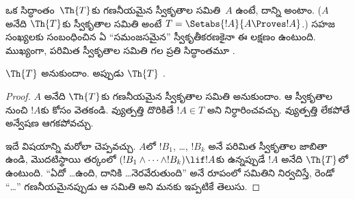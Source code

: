 \documentclass[../../../include/open-logic-section]{subfiles}
\begin{document}


ఒక సిద్ధాంతం~$\Th{T}$కు గణనీయమైన స్వీకృతాల సమితి~$A$ ఉంటే, దాన్ని
\emph{} అంటాం. ($A$ అనేది $\Th{T}$కు స్వీకృతాల సమితి
అంటే $T = \Setabs{!A}{A \Proves !A}$.) సహజ సంఖ్యలకు సంబంధించిన ఏ
``సమంజసమైన'' స్వీకృతీకరణకైనా ఈ లక్షణం ఉంటుంది. ముఖ్యంగా, పరిమిత స్వీకృతాల
సమితి గల ప్రతి సిద్ధాంతమూ .

\begin{lem}
$\Th{T}$  అనుకుందాం. అప్పుడు $\Th{T}$
.
\end{lem}

\begin{proof}
$A$ అనేది $\Th{T}$కు గణనీయమైన స్వీకృతాల సమితి అనుకుందాం. ఆ
స్వీకృతాల నుంచి $!A$కు  కోసం వెతకండి.
వ్యుత్పత్తి దొరికితే $!A \in T$ అని నిర్ధారించవచ్చు. వ్యుత్పత్తి లేకపోతే
అన్వేషణ ఆగకపోవచ్చు.

ఇదే విషయాన్ని మరోలా చెప్పవచ్చు. $A$లో $!B_1$, \dots, $!B_k$ అనే పరిమిత
స్వీకృతాల జాబితా ఉండి, మొదటిస్థాయి తర్కంలో $(!B_1 \land \dots \land !B_k) \lif
!A$కు  ఉన్నప్పుడే $!A$ అనేది $\Th{T}$లో ఉంటుంది.
``ఏదో \dots ఉంది, దానికి \dots నెరవేరుతుంది'' అనే రూపంలో సమితిని
నిర్వచిస్తే, రెండో ``\dots'' గణనీయమైనప్పుడు ఆ సమితి
 అని మనకు ఇప్పటికే తెలుసు.
\end{proof}
\end{document}
